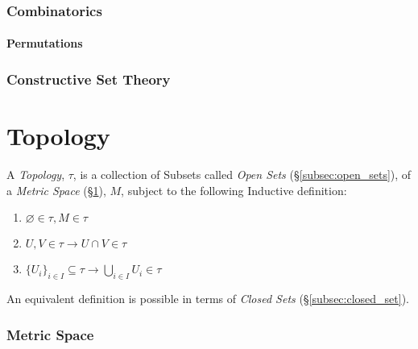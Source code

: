 \documentclass{article}
\begin{document}
\section{Combinatorics}

\subsection{Permutations}\label{subsec:permutations}

\section{Constructive Set Theory}\label{sec:constructive_set_theory}



\part{Topology}\label{sec:topology}\cite{lc11}

A \emph{Topology}, $\tau$, is a collection of Subsets called
\emph{Open Sets} (\S\ref{subsec:open_sets}), of a \emph{Metric Space}
(\S\ref{sec:metric_space}), $M$, subject to the following Inductive
definition:
\begin{enumerate}
\item $\varnothing \in \tau, M \in \tau$
\item $U,V \in \tau \rightarrow U \cap V \in \tau$
\item $\{U_i\}_{i \in I} \subseteq \tau \rightarrow \bigcup_{i \in I}
  U_i \in \tau$
\end{enumerate}

An equivalent definition is possible in terms of \emph{Closed Sets}
(\S\ref{subsec:closed_set}).

\section{Metric Space}\label{sec:metric_space}
\end{document}
